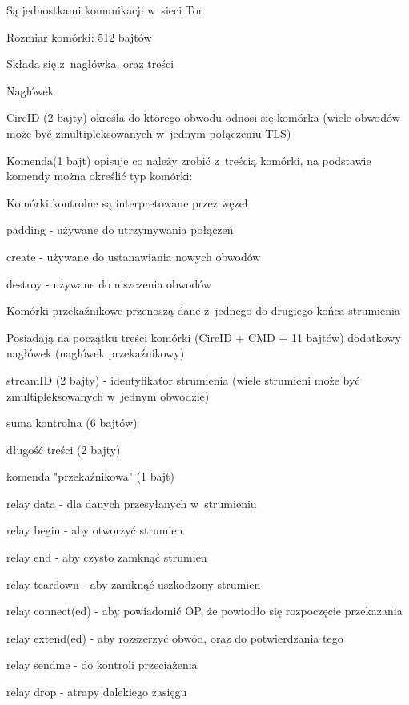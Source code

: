    \begin{description}
    \item Są jednostkami komunikacji w~sieci Tor
    \item Rozmiar komórki: 512 bajtów
    \item Składa się z~nagłówka, oraz treści
    \item Nagłówek
    \begin{description}
     \item CircID (2 bajty) określa do którego obwodu odnosi się komórka (wiele obwodów może być zmultipleksowanych w~jednym połączeniu TLS)
     \item Komenda(1 bajt) opisuje co należy zrobić z~treścią komórki, na podstawie komendy można określić typ komórki:
     \begin{description}
      \item Komórki kontrolne są interpretowane przez węzeł
      \begin{description}
       \item padding - używane do utrzymywania połączeń
       \item create - używane do ustanawiania nowych obwodów
       \item destroy - używane do niszczenia obwodów
      \end{description}

      \item Komórki przekaźnikowe przenoszą dane z~jednego do drugiego końca strumienia
      \begin{description}
       \item Posiadają na początku treści komórki (CircID + CMD + 11 bajtów) dodatkowy nagłówek (nagłówek przekaźnikowy)
       \begin{description}
	\item streamID (2 bajty) - identyfikator strumienia (wiele strumieni może być zmultipleksowanych w~jednym obwodzie)
	\item suma kontrolna (6 bajtów)
	\item długość treści (2 bajty)
	\item komenda "przekaźnikowa" (1 bajt)
	\begin{description}
	 \item relay data - dla danych przesyłanych w~strumieniu
	 \item relay begin - aby otworzyć strumien
	 \item relay end - aby czysto zamknąć strumien
	 \item relay teardown - aby zamknąć uszkodzony strumien
	 \item relay connect(ed) - aby powiadomić OP, że powiodło się rozpoczęcie przekazania
	 \item relay extend(ed) - aby rozszerzyć obwód, oraz do potwierdzania tego
	 \item relay sendme - do kontroli przeciążenia
	 \item relay drop - atrapy dalekiego zasięgu
	\end{description}


\end{description}
\end{description}
\end{description}
\end{description}
\end{description}
